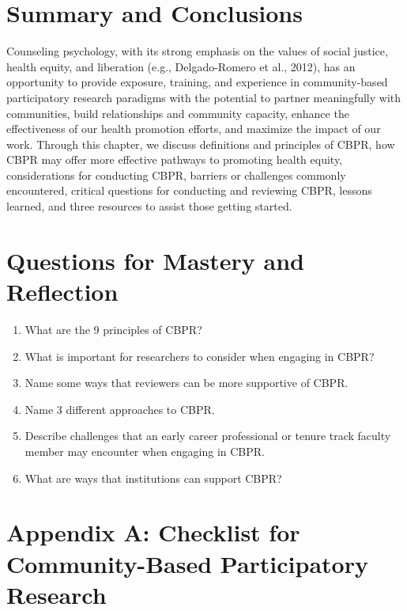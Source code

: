 \documentclass[
  11pt,
]{book}
\providecommand{\tightlist}{%
  \setlength{\itemsep}{0pt}\setlength{\parskip}{0pt}}
\begin{document}
\hypertarget{summary-and-conclusions}{%
\section{Summary and Conclusions}\label{summary-and-conclusions}}

Counseling psychology, with its strong emphasis on the values of social justice, health equity, and liberation (e.g., Delgado-Romero et al., 2012), has an opportunity to provide exposure, training, and experience in community-based participatory research paradigms with the potential to partner meaningfully with communities, build relationships and community capacity, enhance the effectiveness of our health promotion efforts, and maximize the impact of our work. Through this chapter, we discuss definitions and principles of CBPR, how CBPR may offer more effective pathways to promoting health equity, considerations for conducting CBPR, barriers or challenges commonly encountered, critical questions for conducting and reviewing CBPR, lessons learned, and three resources to assist those getting started.

\hypertarget{questions-for-mastery-and-reflection}{%
\section{Questions for Mastery and Reflection}\label{questions-for-mastery-and-reflection}}

\begin{enumerate}
\def\labelenumi{\arabic{enumi}.}
\tightlist
\item
  What are the 9 principles of CBPR?
\item
  What is important for researchers to consider when engaging in CBPR?
\item
  Name some ways that reviewers can be more supportive of CBPR.
\item
  Name 3 different approaches to CBPR.
\item
  Describe challenges that an early career professional or tenure track faculty member may encounter when engaging in CBPR.
\item
  What are ways that institutions can support CBPR?
\end{enumerate}

\hypertarget{appendix-a-checklist-for-community-based-participatory-research}{%
\section{Appendix A: Checklist for Community-Based Participatory Research}\label{appendix-a-checklist-for-community-based-participatory-research}}
\end{document}
